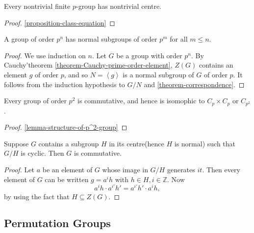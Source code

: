 \begin{theorem}
  \label{theorem-finite-p-group-has-nontrivial-centre}
  Every nontrivial finite \( p \)-group has nontrivial centre.
\end{theorem}
\begin{proof}
  \ref{proposition-class-equation}
\end{proof}

\begin{corollary}
  \label{corollary-normal-subgroup-of-p-group}
  A group of order \( p^n \) has normal subgroups of order \( p^m \) for all \( m \leq n \).
\end{corollary}
\begin{proof}
  We use induction on \( n \).
  Let \( G \) be a group with order \( p^n \).
  By Cauchy'theorem \ref{theorem-Cauchy-prime-order-element}, \( Z(G) \) contains an element \( g \) of order \( p \), and so \( N = \left\langle g \right\rangle \) is a normal subgroup of \( G \) of order \( p \).
  It follows from the induction hypothesis to \( G / N \) and \ref{theorem-correspondence}.
\end{proof}

\begin{proposition}
  \label{proposition-structure-of-p^2-group}
  Every group of order \( p^2 \) is commutative, and hence is isomophic to \( C_p \times C_p \) or \( C_{p^2} \).
\end{proposition}
\begin{proof}
  \ref{lemma-structure-of-p^2-group}
\end{proof}

\begin{lemma}
  \label{lemma-structure-of-p^2-group}
  Suppose \( G \) contains a subgroup \( H \) in its centre(hence \( H \) is normal) such that \( G / H \) is cyclic.
  Then \( G \) is commutative.
\end{lemma}
\begin{proof}
  Let \( a \) be an element of \( G \) whose image in \( G / H \) generates \( it \).
  Then every element of \( G \) can be written \( g = a^i h \) with \( h \in H, i \in \mathbb{Z} \).
  Now
  \[
    a^i h \cdot a^{i'} h' = a^{i'} h' \cdot a^i h,
  \]
  by using the fact that \( H \subseteq Z(G) \).
\end{proof}

\subsection{Permutation Groups}
\label{subsection-permutation-groups}

